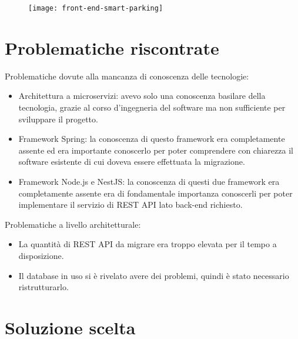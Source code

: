 \begin{figure}[!h]
    \centering
    \texttt{[image: front-end-smart-parking]}
\end{figure}

\section{Problematiche riscontrate}

Problematiche dovute alla mancanza di conoscenza delle tecnologie:
\begin{itemize}
    \item Architettura a microservizi: avevo solo una conoscenza basilare
          della tecnologia, grazie al corso d'ingegneria del software ma non
          sufficiente per sviluppare il progetto.
    \item Framework Spring: la conoscenza di questo framework era completamente assente
        ed era importante conoscerlo per poter comprendere con chiarezza il software esistente
        di cui doveva essere effettuata la migrazione.
    \item Framework Node.js e NestJS: la conoscenza di questi due framework era completamente
        assente era di fondamentale importanza conoscerli per poter implementare il servizio
        di REST API lato back-end richiesto.
\end{itemize}
\leavevmode\newline
Problematiche a livello architetturale:
\begin{itemize}
    \item La quantità di REST API da migrare era troppo elevata per il tempo a disposizione.
    \item Il database in uso si è rivelato avere dei problemi, quindi è stato necessario ristrutturarlo.
\end{itemize}

\section{Soluzione scelta}

